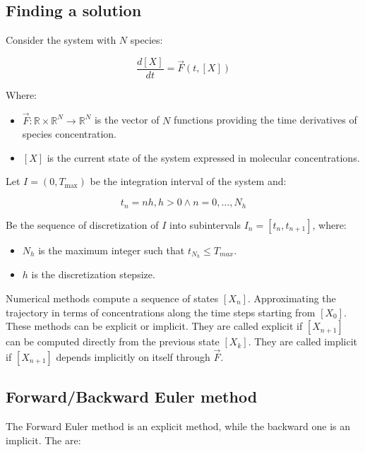   \subsection{Finding a solution}
  Consider the system with $N$ species:

  $$\frac{d[X]}{dt} = \vec{F}(t,[X])$$

  Where:

  \begin{multicols}{2}
    \begin{itemize}
      \item $\vec{F}:\mathbb{R}\times\mathbb{R}^N\rightarrow\mathbb{R}^N$ is the vector of $N$ functions providing the time derivatives of species concentration.
      \item $[X]$ is the current state of the system expressed in molecular concentrations.
    \end{itemize}
  \end{multicols}

  Let $I = (0,T_{\max})$ be the integration interval of the system and:

  $$t_n = nh, h>0\land n = 0, \dots, N_h$$

  Be the sequence of discretization of $I$ into subintervals $I_n = [t_n, t_{n+1}]$, where:

  \begin{multicols}{2}
    \begin{itemize}
      \item $N_h$ is the maximum integer such that $t_{N_h}\le T_{max}$.
      \item $h$ is the discretization stepsize.
    \end{itemize}
  \end{multicols}

  Numerical methods compute a sequence of states $[X_n]$.
  Approximating the trajectory in terms of concentrations along the time steps starting from $[X_0]$.
  These methods can be explicit or implicit.
  They are called explicit if $[X_{n+1}]$ can be computed directly from the previous state $[X_k]$.
  They are called implicit if $[X_{n+1}]$ depends implicitly on itself through $\vec{F}$.

  \subsection{Forward/Backward Euler method}
  The Forward Euler method is an explicit method, while the backward one is an implicit.
  The are:

